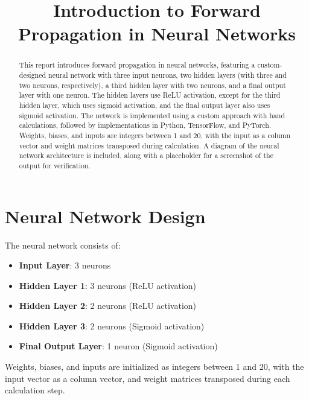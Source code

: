 \documentclass[a4paper,12pt]{article}
\begin{document}
\title{Introduction to Forward Propagation in Neural Networks}
\author{}
\date{}
\maketitle

\begin{abstract}
This report introduces forward propagation in neural networks, featuring a custom-designed neural network with three input neurons, two hidden layers (with three and two neurons, respectively), a third hidden layer with two neurons, and a final output layer with one neuron. The hidden layers use ReLU activation, except for the third hidden layer, which uses sigmoid activation, and the final output layer also uses sigmoid activation. The network is implemented using a custom approach with hand calculations, followed by implementations in Python, TensorFlow, and PyTorch. Weights, biases, and inputs are integers between 1 and 20, with the input as a column vector and weight matrices transposed during calculation. A diagram of the neural network architecture is included, along with a placeholder for a screenshot of the output for verification.
\end{abstract}

\section{Neural Network Design}
The neural network consists of:
\begin{itemize}
    \item \textbf{Input Layer}: 3 neurons
    \item \textbf{Hidden Layer 1}: 3 neurons (ReLU activation)
    \item \textbf{Hidden Layer 2}: 2 neurons (ReLU activation)
    \item \textbf{Hidden Layer 3}: 2 neurons (Sigmoid activation)
    \item \textbf{Final Output Layer}: 1 neuron (Sigmoid activation)
\end{itemize}
Weights, biases, and inputs are initialized as integers between 1 and 20, with the input vector as a column vector, and weight matrices transposed during each calculation step.

\end{document}
